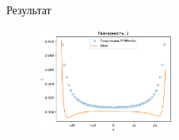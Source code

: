 \documentclass[t]{beamer}
\begin{document}
\begin{frame}
\begin{figure}[h]
\begin{subfigure}{0.35\textwidth}
            \end{subfigure}
        \end{figure}
        Результат
        \begin{figure}[H]
            \center
            \includegraphics[width=0.4\textwidth]{../plots/ek/2-dim tanh 20x4.png}
        \end{figure}
    \end{frame}
\end{document}
